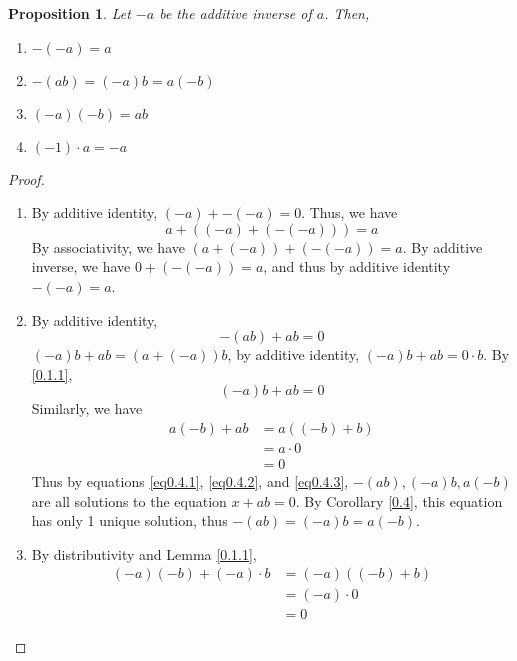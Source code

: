 \documentclass{article}
\newtheorem{prop}[thm]{Proposition}
\begin{document}
\begin{prop}
\label{0.4.1} Let $-a$ be the additive inverse of $a$. Then,
\begin{enumerate}
    \item $-(-a)=a$
    \item $-(ab)=(-a)b=a(-b)$
    \item $(-a)(-b)=ab$
    \item $(-1)\cdot a=-a$
\end{enumerate}
\end{prop}


\begin{proof}
\begin{enumerate}
    \item By additive identity, $(-a)+-(-a)=0$. Thus, we have 
    $$a+((-a)+(-(-a)))=a$$ By associativity, we have $(a+(-a))+(-(-a))=a$. By additive inverse, we have $0+(-(-a))=a$, and thus by additive identity $-(-a)=a$.
    \item By additive identity, 
    \begin{equation}\label{eq0.4.1}
        -(ab)+ab=0
    \end{equation}
    $(-a)b+ab=(a+(-a))b$, by additive identity, $(-a)b+ab=0\cdot b$. By \ref{0.1.1}, 
    \begin{equation}\label{eq0.4.2}
        (-a)b+ab=0
    \end{equation}
    Similarly, we have 
    \begin{equation}\label{eq0.4.3}
        \begin{split}
            a(-b)+ab & =a((-b)+b)\\
            &= a\cdot 0\\
            & =0
        \end{split}
    \end{equation}
    Thus by equations \ref{eq0.4.1}, \ref{eq0.4.2}, and \ref{eq0.4.3}, $-(ab),(-a)b,a(-b)$ are all solutions to the equation $x+ab=0$. By Corollary \ref{0.4}, this equation has only 1 unique solution, thus $-(ab)=(-a)b=a(-b)$. 
    \item By distributivity and Lemma \ref{0.1.1},
    \begin{equation}
        \begin{split}
            (-a)(-b)+(-a)\cdot b&= (-a)((-b)+b)\\
            &= (-a)\cdot 0\\
            &= 0
        \end{split}
    \end{equation}

\end{enumerate}
\end{proof}
\end{document}
